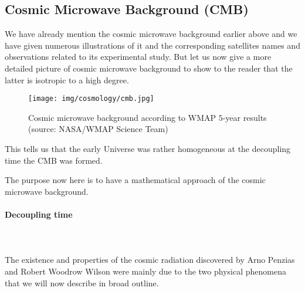 	\subsection{Cosmic Microwave Background (CMB)}\label{cosmic microwave background}
	We have already mention the cosmic microwave background earlier above and we have given numerous illustrations of it and the corresponding satellites names and observations related to its experimental study. But let us now give a more detailed picture of cosmic microwave background to show to the reader that the latter is isotropic to a high degree. 
	\begin{figure}[H]
		\centering
		\texttt{[image: img/cosmology/cmb.jpg]}
		\caption[Cosmic microwave background according to WMAP $5$-year results]{Cosmic microwave background according to WMAP $5$-year results (source: NASA/WMAP Science Team)}
	\end{figure}
	This tells us that the early Universe was rather homogeneous at the decoupling time the CMB was formed.
	
	The purpose now here is to have a mathematical approach of the  cosmic microwave background.
	
	\paragraph{Decoupling time}\mbox{}\\\\
	The existence and properties of the cosmic radiation discovered by Arno Penzias and Robert Woodrow Wilson were mainly due to the two physical phenomena that we will now describe in broad outline.

